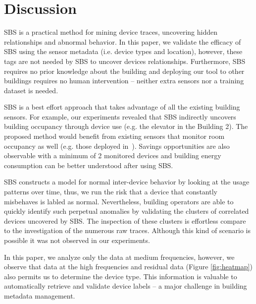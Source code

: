 \section{Discussion} \label{discussion}
SBS is a practical method for mining device traces, uncovering hidden relationships and abnormal behavior. 
In this paper, we validate the efficacy of SBS using the sensor metadata (i.e. device types and location), however, these 
tags are not needed by SBS to uncover devices relationships.
Furthermore, SBS requires no prior knowledge about the building and deploying our tool to other buildings requires no human intervention --
neither extra sensors nor a training dataset is needed. 

SBS is a best effort approach that takes advantage of all the existing building sensors.
For example, our experiments revealed that SBS indirectly uncovers building occupancy through device use (e.g. the elevator in the Building 2). 
The proposed method would benefit from existing sensors that monitor room occupancy as well (e.g. those deployed in~\cite{agarwal:ipsn2011,erickson:ipsn2011}).  %
Savings opportunities are also observable with a minimum of 2 monitored devices and building energy consumption can be better understood after using SBS.

SBS constructs a model for normal inter-device behavior by looking at the usage patterns over time, thus, we run the risk that
a device that constantly misbehaves is labled as normal.  %
Nevertheless, building operators are able to quickly identify such perpetual anomalies by validating the clusters of correlated devices uncovered by SBS.
The inspection of these clusters is effortless compare to the investigation of the numerous raw traces.  
Although this kind of scenario is possible it was not observed in our experiments.

In this paper, we analyze only the data at medium frequencies, however, we observe that data at the high frequencies and residual data (Figure \ref{fig:heatmap}) also permits us to determine the device type.  %
This information is valuable to automatically retrieve and validate device labels -- a major challenge in building metadata
management.

